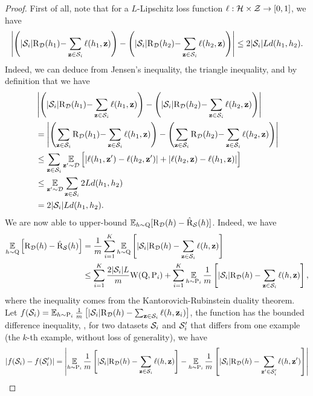 \begin{noaddcontents}
\begin{proof}
    First of all, note that for a $L$-Lipschitz loss function $\loss: \H\times\Z\to[0,1]$, we have
    \begin{align}
    \LN\LP |\S_i|\Risk_{\D}(h_1){-}\sum_{\z\in\S_i}\loss(h_1, \z)\RP - \LP |\S_i|\Risk_{\D}(h_2){-}\sum_{\z\in\S_i}\loss(h_2, \z)\RP\right\vert \le 2|\S_i|Ld(h_1, h_2).\label{eq:alt-proof-supervised-1}
    \end{align}
    Indeed, we can deduce  from Jensen's inequality, the triangle inequality, and by definition that we have
    \begin{align*}
    &\LN\LP |\S_i|\Risk_{\D}(h_1){-}\sum_{\z\in\S_i}\loss(h_1, \z)\RP - \LP |\S_i|\Risk_{\D}(h_2){-}\sum_{\z\in\S_i}\loss(h_2, \z)\RP\right\vert\\
    &= \LN\LP\sum_{\z\in\S_i}\Risk_{\D}(h_1){-}\sum_{\z\in\S_i}\loss(h_1, \z)\RP - \LP\sum_{\z\in\S_i}\Risk_{\D}(h_2){-}\sum_{\z\in\S_i}\loss(h_2, \z)\RP\right\vert\\
    &\le \sum_{\z\in\S_i}\EE_{\z'\sim\D}\Big[ |\loss(h_1, \z')-\loss(h_2, \z')|+|\loss(h_2, \z)-\loss(h_1, \z)|\Big]\\
    &\le \EE_{\z'\sim\D}\sum_{\z\in\S_i} 2Ld(h_1, h_2)\\
    &= 2|\S_i|Ld(h_1, h_2).
    \end{align*}
    We are now able to upper-bound $\EE_{h\sim\Q}[ \Risk_{\D}(h) - \Riskhat_{\S}(h) ]$. 
    Indeed, we have
    \begin{align}
    \EE_{h\sim\Q}\Big[ \Risk_{\D}(h) - \Riskhat_{\S}(h) \Big] &= \frac{1}{m}\sum_{i=1}^{K} \EE_{h\sim\Q}\LB |\S_i|\Risk_{\D}(h) - \sum_{\z\in\S_i}\loss(h, \z) \RB\nonumber\\
    &\le \sum_{i=1}^{K} \frac{2|\S_i|L}{m}\W(\Q, \P_i) + \sum_{i=1}^{K} \EE_{h\sim\P_i} \frac{1}{m}\LB |\S_i|\Risk_{\D}(h) - \sum_{\z\in\S_i} \loss(h, \z) \RB,\label{eq:alt-proof-supervised-2}
    \end{align}
    where the inequality comes from the Kantorovich-Rubinstein duality theorem.
    Let $f(\S_i)=\EE_{h\sim\P_i} \frac{1}{m}\LB |\S_i|\Risk_{\D}(h) - \sum_{\z\in\S_i} \loss(h, \z_i)\RB$, the function has the bounded difference inequality, \ie, for two datasets $\S_i$ and $\S'_i$ that differs from one example (the $k$-th example, without loss of generality), we have
    \begin{align*}
    \LN f(\S_i) - f(\S'_i) \right\vert &= \LN \EE_{h\sim\P_i} \frac{1}{m}\LB |\S_i|\Risk_{\D}(h) - \sum_{\z\in\S_i} \loss(h, \z)\RB - \EE_{h\sim\P_i} \frac{1}{m}\LB |\S_i|\Risk_{\D}(h) - \sum_{\z'\in\S'_i} \loss(h, \z')\RB \right\vert\\

\end{align*}
\end{proof}
\end{noaddcontents}
